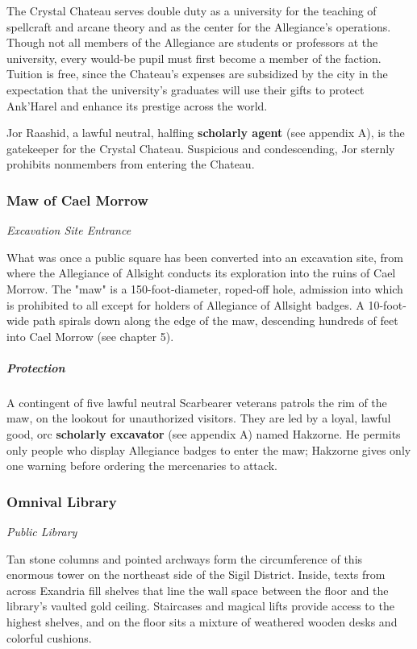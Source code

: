 \documentclass[10pt,a4paper,twoside,fancy,bg=print,twocolumn,openany,nodeprecatedcode]{dndbook}
\begin{document}
The Crystal Chateau serves double duty as a university for the teaching of spellcraft and arcane theory and as the center for the Allegiance's operations. Though not all members of the Allegiance are students or professors at the university, every would-be pupil must first become a member of the faction. Tuition is free, since the Chateau's expenses are subsidized by the city in the expectation that the university's graduates will use their gifts to protect Ank'Harel and enhance its prestige across the world.

Jor Raashid, a lawful neutral, halfling \textbf{scholarly agent} (see appendix A), is the gatekeeper for the Crystal Chateau. Suspicious and condescending, Jor sternly prohibits nonmembers from entering the Chateau.

\subsubsection{Maw of Cael Morrow}
\textit{Excavation Site Entrance}

What was once a public square has been converted into an excavation site, from where the Allegiance of Allsight conducts its exploration into the ruins of Cael Morrow. The "maw" is a 150-foot-diameter, roped-off hole, admission into which is prohibited to all except for holders of Allegiance of Allsight badges. A 10-foot-wide path spirals down along the edge of the maw, descending hundreds of feet into Cael Morrow (see chapter 5).

\subparagraph{Protection}
A contingent of five lawful neutral Scarbearer veterans patrols the rim of the maw, on the lookout for unauthorized visitors. They are led by a loyal, lawful good, orc \textbf{scholarly excavator} (see appendix A) named Hakzorne. He permits only people who display Allegiance badges to enter the maw; Hakzorne gives only one warning before ordering the mercenaries to attack.

\subsubsection{Omnival Library}
\textit{Public Library}

Tan stone columns and pointed archways form the circumference of this enormous tower on the northeast side of the Sigil District. Inside, texts from across Exandria fill shelves that line the wall space between the floor and the library's vaulted gold ceiling. Staircases and magical lifts provide access to the highest shelves, and on the floor sits a mixture of weathered wooden desks and colorful cushions.
\end{document}
